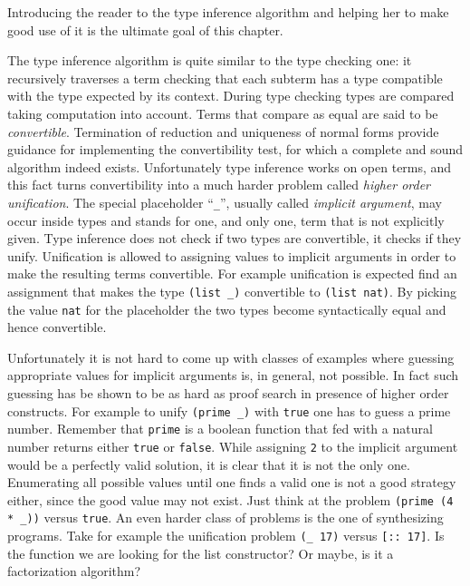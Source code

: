 Introducing the reader to the type inference algorithm and helping her
to make good use of it is the ultimate goal of this chapter.

\mcbREQUIRE{}
\label{sec:hounif}

The type inference algorithm is quite similar to the type checking
one: it recursively traverses a term checking that each subterm has a
type compatible with the type expected by its context.  During type
checking types are compared taking computation into account.  Terms
that compare as equal are said to be \emph{convertible}.
Termination of reduction and uniqueness of normal forms provide
guidance for implementing the convertibility test, for which a
complete and sound algorithm indeed exists.  Unfortunately type
inference works on open terms, and this fact turns convertibility into
a much harder problem called \emph{higher order unification}.  The
special placeholder ``\lstinline/_/'', usually called \emph{implicit
argument}, may occur inside types and stands for one, and only one,
term that is not explicitly given.  Type inference does not check if
two types are convertible, it checks if they unify.
Unification is allowed to assigning values to implicit arguments in order
to make the resulting terms convertible.  For example unification is
expected find an assignment that makes the type
\lstinline/(list _)/ convertible to \lstinline/(list nat)/.
By picking the value \lstinline/nat/ for the placeholder
the two types become syntactically equal and hence convertible. 

Unfortunately it is not hard to come up with classes of examples where
guessing appropriate values for implicit arguments is, in general, not
possible. In fact such guessing has be shown to be as hard as proof
search in presence of higher order constructs.
For example to unify \lstinline/(prime _)/ with
\lstinline/true/ one has to guess a prime number. Remember that
\lstinline/prime/ is a boolean function that fed with a natural
number returns either \lstinline/true/ or \lstinline/false/.
While assigning \lstinline/2/ to the implicit argument
would be a perfectly valid solution, it is clear
that it is not the only one.  Enumerating all possible
values until one finds a valid one is not a good strategy
either, since the good value may not exist.  Just think at the
problem \lstinline/(prime (4 * _))/ versus \lstinline/true/.  An even
harder class of problems is the one of synthesizing programs.
Take for example the unification problem \lstinline/(_ 17)/ versus
\lstinline/[:: 17]/.  Is the function we are looking for the list
constructor? Or maybe, is it a factorization algorithm?

